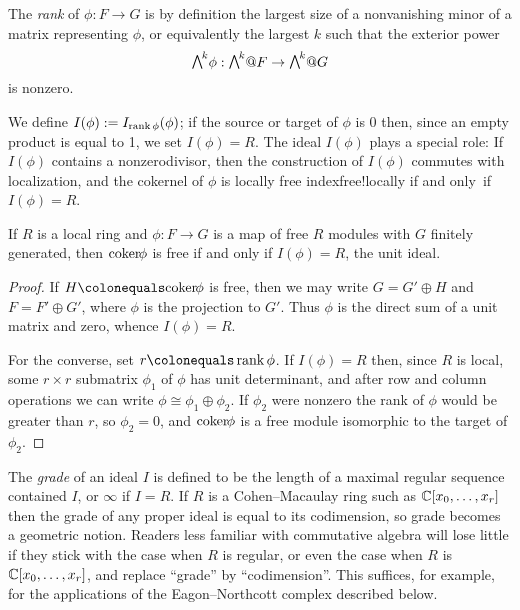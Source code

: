 The \emph{rank} of $\phi: F\to G$ is by definition the largest size of a nonvanishing
%
minor of a matrix representing $\phi$,
or equivalently the largest $k$ such that the
exterior power
%
$$\mwedge^{k}\phi : \mwedge^{k}@F \to \mwedge^{k}@G$$
is nonzero. 

We define
$I(\phi): = I_{\operatorname{rank} \phi}(\phi)$; if the source or target of $\phi$ is 0 then, since an empty
product is equal to 1,
we set $I(\phi) = R$.  The ideal $I(\phi)$ plays a special role: 
If $I(\phi)$ contains a 
nonzerodivisor,
%
then the construction of $I(\phi)$
commutes with localization, and the cokernel
of $\phi$
is  
locally free
index{free!locally}
 if and only~if $I(\phi) = R$. 

\begin{lemma}\label{free coker}
If $R$ is a local ring and $\phi: F\to G$ is a map of free $R$ modules
with $G$ finitely generated,
then $\coker \phi$ is free if and only if $I(\phi) = R$, the unit ideal.
\end{lemma}

\begin{proof}
 If $H \colonequals \coker \phi$ is free, then we may write
 $G = G'\oplus H$ and $F = F'\oplus G'$, where $\phi$ is the projection to $G'$.
 Thus $\phi$ is the direct sum of a unit matrix and zero, whence $I(\phi) = R$.
 
For the converse, set $r\colonequals \rank \phi$. If $I(\phi) = R$
then, 
since
$R$ is local, some $r \times r$ submatrix $\phi_{1}$ of
$\phi$ has unit determinant, and after row and column operations we
can write $\phi \cong \phi_{1}\oplus \phi_{2}$. If $\phi_{2}$
were nonzero
the rank of $\phi$ would be greater than $r$, so $\phi_{2} = 0$, and
$\coker \phi$ is a free module isomorphic to the target of $\phi_{2}$.
\end{proof}

The \emph{grade} of an ideal $I$ is defined to be the length of a maximal regular
%
sequence
contained $I$, or $\infty$ if $I=R$. If $R$ is a
Cohen--Macaulay ring
%
such as
${\mathbb C}[x_{0},\dots, x_{r}]$ then the grade
of any proper ideal is equal to its codimension, so grade becomes a
geometric notion.
Readers less familiar with commutative algebra will lose little if they
stick with the case when $R$ is
regular, or even the case when $R$ is ${\mathbb C}[x_{0},\dots, x_{r}]$,
and replace ``grade'' by ``codimension''. This
suffices, for example, for the applications
%
of the Eagon--Northcott complex described below.

